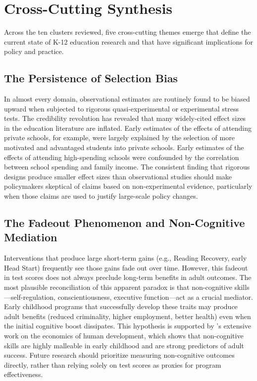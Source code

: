 \documentclass[12pt,letterpaper]{article}
\begin{document}
\section{Cross-Cutting Synthesis}

Across the ten clusters reviewed, five cross-cutting themes emerge that define the current state of K-12 education research and that have significant implications for policy and practice.

\subsection{The Persistence of Selection Bias}

In almost every domain, observational estimates are routinely found to be biased upward when subjected to rigorous quasi-experimental or experimental stress tests. The credibility revolution has revealed that many widely-cited effect sizes in the education literature are inflated. Early estimates of the effects of attending private schools, for example, were largely explained by the selection of more motivated and advantaged students into private schools. Early estimates of the effects of attending high-spending schools were confounded by the correlation between school spending and family income. The consistent finding that rigorous designs produce smaller effect sizes than observational studies should make policymakers skeptical of claims based on non-experimental evidence, particularly when those claims are used to justify large-scale policy changes.

\subsection{The Fadeout Phenomenon and Non-Cognitive Mediation}

Interventions that produce large short-term gains (e.g., Reading Recovery, early Head Start) frequently see those gains fade out over time. However, this fadeout in test scores does not always preclude long-term benefits in adult outcomes. The most plausible reconciliation of this apparent paradox is that non-cognitive skills---self-regulation, conscientiousness, executive function---act as a crucial mediator. Early childhood programs that successfully develop these traits may produce adult benefits (reduced criminality, higher employment, better health) even when the initial cognitive boost dissipates. This hypothesis is supported by \citet{heckman2006}'s extensive work on the economics of human development, which shows that non-cognitive skills are highly malleable in early childhood and are strong predictors of adult success. Future research should prioritize measuring non-cognitive outcomes directly, rather than relying solely on test scores as proxies for program effectiveness.
\end{document}
